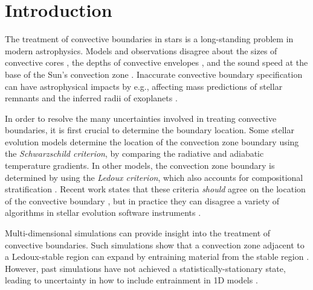 
\section{Introduction}
\label{sec:introduction}
The treatment of convective boundaries in stars is a long-standing problem in modern astrophysics.
Models and observations disagree about the sizes of convective cores \citep{claret_torres_2018, joyce_chaboyer_2018b, viani_basu_2020, pedersen_etal_2021, johnston_2021}, the depths of convective envelopes \citep[inferred from lithium abundances;][]{pinsonneault_1997, sestito_randich_2005, carlos_etal_2019, dumont_etal_2021}, and the sound speed at the base of the Sun's convection zone \citep[see][Sec.~7.2.1]{basu_2016}.
Inaccurate convective boundary specification can have astrophysical impacts by e.g., affecting mass predictions of stellar remnants \citep{farmer_etal_2019, mehta_etal_2022} and the inferred radii of exoplanets \citep{basu_etal_2012, morrell_2020}.

In order to resolve the many uncertainties involved in treating convective boundaries, it is first crucial to determine the boundary location.
Some stellar evolution models determine the location of the convection zone boundary using the \emph{Schwarzschild criterion}, by comparing the radiative and adiabatic temperature gradients.
In other models, the convection zone boundary is determined by using the \emph{Ledoux criterion}, which also accounts for compositional stratification \citep[][chapter 3, reviews these criteria]{salaris_cassisi_2017}.
Recent work states that these criteria \emph{should} agree on the location of the convective boundary \citep{gabriel_etal_2014, mesa4, mesa5}, but in practice they can disagree \citep[see][chapter 2]{kaiser_etal_2020} 
 a variety of algorithms in stellar evolution software instruments \citep{mesa4,mesa5}.

Multi-dimensional simulations can provide insight into the treatment of convective boundaries.
Such simulations show that a convection zone adjacent to a Ledoux-stable region can expand by entraining material from the stable region \citep{meakin_arnett_2007, woodward_etal_2015, jones_etal_2017, cristini_etal_2019, fuentes_cumming_2020, andrassy_etal_2020, andrassy_etal_2021}.
However, past simulations have not achieved a statistically-stationary state, leading to uncertainty in how to include entrainment in 1D models \citep{staritsin_2013, scott_etal_2021}.

